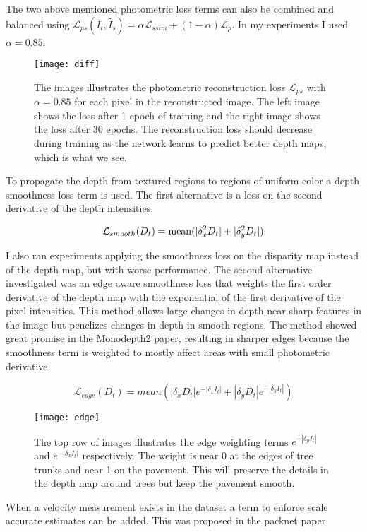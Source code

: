 The two above mentioned photometric loss terms can also be combined and balanced using $ \mathcal{L}_{ps}(I_t, \hat{I}_s) = \alpha \mathcal{L}_{ssim} + (1-\alpha) \mathcal{L}_p $. In my experiments I used $\alpha=0.85$.

\begin{figure}[H]
	\centering
	\texttt{[image: diff]}
	\caption{The images illustrates the photometric reconstruction loss $ \mathcal{L}_{ps} $ with $\alpha=0.85$ for each pixel in the reconstructed image. The left image shows the loss after 1 epoch of training and the right image shows the loss after 30 epochs. The reconstruction loss should decrease during training as the network learns to predict better depth maps, which is what we see.}
	\label{fig:diff}
\end{figure}

To propagate the depth from textured regions to regions of uniform color a depth smoothness loss term is used. The first alternative is a loss on the second derivative of the depth intensities.

\[
\mathcal{L}_{smooth}(D_t)=\operatorname{mean}(|\delta_x^2 D_t|+|\delta_y^2 D_t|)
\]

I also ran experiments applying the smoothness loss on the disparity map instead of the depth map, but with worse performance. The second alternative investigated was an edge aware smoothness loss that weights the first order derivative of the depth map with the exponential of the first derivative of the pixel intensities. This method allows large changes in depth near sharp features in the image but penelizes changes in depth in smooth regions. The method showed great promise in the Monodepth2 paper, resulting in sharper edges because the smoothness term is weighted to mostly affect areas with small photometric derivative.

\[
\mathcal{L}_{edge}(D_t)=mean(|\delta_x D_t|e^{-|\delta_x I_t|} + |\delta_y D_t|e^{-|\delta_y I_t|})
\]

\begin{figure}[H]
	\centering
	\texttt{[image: edge]}
	\caption{The top row of images illustrates the edge weighting terms $e^{-|\delta_y I_t|}$ and $e^{-|\delta_x I_t|}$ respectively. The weight is near 0 at the edges of tree trunks and near 1 on the pavement. This will preserve the details in the depth map around trees but keep the pavement smooth.}
	\label{fig:edge}
\end{figure}

\iffalse
When a velocity measurement exists in the dataset a term to enforce scale accurate estimates can be added. This was proposed in the packnet paper\cite{packnet}.

